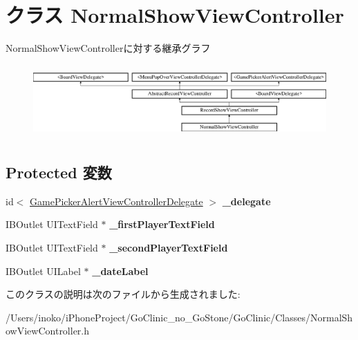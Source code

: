 \hypertarget{interface_normal_show_view_controller}{
\section{クラス NormalShowViewController}
\label{interface_normal_show_view_controller}
}
NormalShowViewControllerに対する継承グラフ\begin{figure}[H]
\begin{center}
\leavevmode
\includegraphics[height=2.839037cm]{interface_normal_show_view_controller}
\end{center}
\end{figure}
\subsection*{Protected 変数}
\begin{DoxyCompactItemize}
\item 
\hypertarget{interface_normal_show_view_controller_a9f09b73cf79c192e3575673bdc3a03ee}{
id$<$ \hyperlink{protocol_game_picker_alert_view_controller_delegate-p}{GamePickerAlertViewControllerDelegate} $>$ {\bfseries \_\-delegate}}
\label{interface_normal_show_view_controller_a9f09b73cf79c192e3575673bdc3a03ee}

\item 
\hypertarget{interface_normal_show_view_controller_ae769e6b48507a7983894f2f5f3e00eb0}{
IBOutlet UITextField $\ast$ {\bfseries \_\-firstPlayerTextField}}
\label{interface_normal_show_view_controller_ae769e6b48507a7983894f2f5f3e00eb0}

\item 
\hypertarget{interface_normal_show_view_controller_ad7220c0c188a0a95335e0d848b902ee0}{
IBOutlet UITextField $\ast$ {\bfseries \_\-secondPlayerTextField}}
\label{interface_normal_show_view_controller_ad7220c0c188a0a95335e0d848b902ee0}

\item 
\hypertarget{interface_normal_show_view_controller_a7246229a33a7ccc3e0ea5d80176411bb}{
IBOutlet UILabel $\ast$ {\bfseries \_\-dateLabel}}
\label{interface_normal_show_view_controller_a7246229a33a7ccc3e0ea5d80176411bb}

\end{DoxyCompactItemize}


このクラスの説明は次のファイルから生成されました:\begin{DoxyCompactItemize}
\item 
/Users/inoko/iPhoneProject/GoClinic\_\-no\_\-GoStone/GoClinic/Classes/NormalShowViewController.h\end{DoxyCompactItemize}
